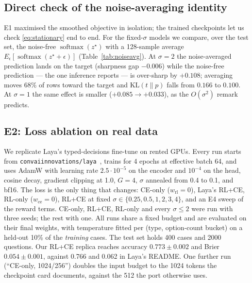 \documentclass[conference]{IEEEtran}
\DeclareMathOperator{\softmax}{softmax}
\begin{document}
\subsection{Direct check of the noise-averaging identity}
\label{sec:noiseavg}

E1 maximised the smoothed objective in isolation; the trained checkpoints let
us check \eqref{eq:stationary} end to end. For the fixed-$\sigma$ models we
compare, over the test set, the noise-free $\softmax(z^\star)$ with a
128-sample average $E_\epsilon[\softmax(z^\star+\epsilon)]$
(Table~\ref{tab:noiseavg}). At $\sigma{=}2$ the noise-averaged prediction lands
on the target (sharpness gap $-0.006$) while the noise-free prediction --- the
one inference reports --- is over-sharp by $+0.108$; averaging moves 68\% of
rows toward the target and $\mathrm{KL}(t\|p)$ falls from $0.166$ to $0.100$.
At $\sigma{=}1$ the same effect is smaller ($+0.085\to+0.033$), as the
$O(\sigma^2)$ remark predicts.

\begin{table}[t]
\caption{Noise-averaging check on the test set. ``avg'' is the 128-sample
$E_\epsilon[\softmax(z^\star+\epsilon)]$; over-sharpness is
$\overline{\max p}-\overline{\max t}$ (lower is better).}
\label{tab:noiseavg}
\centering
\footnotesize
\setlength{\tabcolsep}{3pt}
\end{table}

\subsection{E2: Loss ablation on real data}
\label{sec:e2}

We replicate Laya's typed-decisions fine-tune on rented GPUs. Every run starts
from \texttt{convaiinnovations/laya}~\cite{laya_hf}, trains for 4 epochs at
effective batch 64, and uses AdamW with learning rate $2.5\cdot10^{-5}$ on the
encoder and $10^{-4}$ on the head, cosine decay, gradient clipping at 1.0,
$G{=}4$, $\sigma$ annealed from 0.4 to 0.1, and bf16. The loss is the only
thing that changes: CE-only ($w_\mathrm{rl}{=}0$), Laya's RL+CE, RL-only
($w_\mathrm{ce}{=}0$), RL+CE at fixed $\sigma\in\{0.25,0.5,1,2,3,4\}$, and an
E4 sweep of the reward terms. CE-only, RL+CE, RL-only and every $\sigma\le2$
were run with three seeds; the rest with one. All runs share a fixed budget
and are evaluated on their final weights, with temperature fitted per (type,
option-count bucket) on a held-out 10\% of the \emph{training} cases. The test
set holds 400 cases and 2000 questions. Our RL+CE replica reaches accuracy
$0.773\pm0.002$ and Brier $0.054\pm0.001$, against 0.766 and 0.062 in Laya's
README. One further run (``CE-only, 1024/256'') doubles the input budget to
the 1024 tokens the checkpoint card documents, against the 512 the port
otherwise uses.
\end{document}

